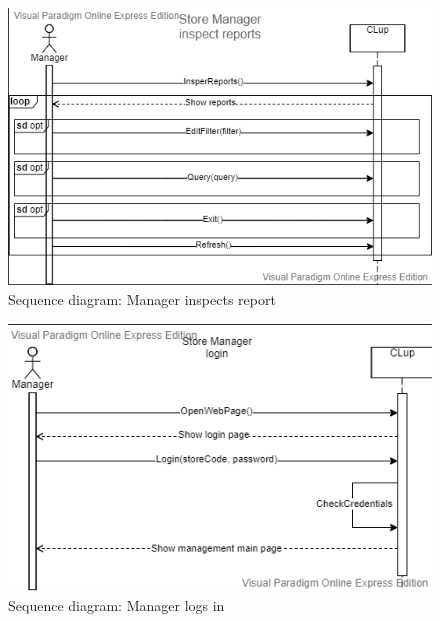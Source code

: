 \begin{figure}[H]
	\includegraphics[width=\linewidth]{../Diagrams/InspectReports.png}
	\caption{Sequence diagram: Manager inspects report}
	\label{fig:InspectRep}
\end{figure} 

\begin{figure}[H]
	\includegraphics[width=\linewidth]{../Diagrams/ManagerLogin.png}
	\caption{Sequence diagram: Manager logs in}
	\label{fig:ManagerLog}
\end{figure} 


